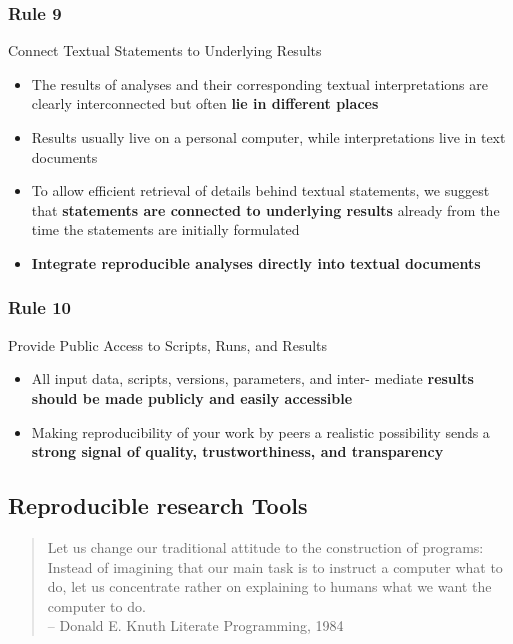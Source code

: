 \documentclass{beamer}
\begin{document}
\begin{frame}
\frametitle{Rule 9}
{\sc Connect Textual Statements to Underlying Results}
\pause
\begin{itemize}
	\item The results of analyses and their corresponding textual interpretations are clearly interconnected but often \textbf{lie in different places}
    \item Results usually live on a personal computer, while interpretations live in text documents
    \item To allow efficient retrieval of details behind textual statements, we suggest that \textbf{statements are connected to underlying results} already from the time the statements are initially formulated
    \item {\bf Integrate reproducible analyses directly into textual documents}
\end{itemize}
\end{frame}
\begin{frame}
\frametitle{Rule 10}
{\sc Provide Public Access to Scripts, Runs, and Results}
\pause
\begin{itemize}
	\item All input data, scripts, versions, parameters, and inter- mediate \textbf{results should be made publicly and easily accessible}
	\item Making reproducibility of your work by peers a realistic possibility sends a \textbf{strong signal of quality, trustworthiness, and transparency}
\end{itemize}
\end{frame}
\begin{frame}
\section{Reproducible research Tools}
\begin{quote}
\scriptsize    Let us change our traditional attitude to the construction of programs: Instead of imagining that our main task is to instruct a computer what to do, let us concentrate rather on explaining to humans what we want the computer to do.\\
\raggedleft   -- Donald E. Knuth Literate Programming, 1984
\end{quote}
\end{frame}
\end{document}
